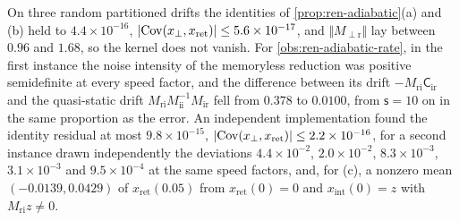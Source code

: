 \begin{numcheck}\label{chk:ren-adiabatic}
On three random partitioned drifts the identities of \cref{prop:ren-adiabatic}(a) and (b) held to $4.4\times10^{-16}$, $\lvert\operatorname{Cov}(x_\perp,x_{\mathrm{ret}})\rvert\le5.6\times10^{-17}$, and $\Vert M_{\perp\mathrm r}\Vert$ lay between $0.96$ and $1.68$, so the kernel does not vanish. For \cref{obs:ren-adiabatic-rate}, in the first instance the noise intensity of the memoryless reduction was positive semidefinite at every speed factor, and the difference between its drift $-M_{\mathrm{ri}}\mathsf C_{\mathrm{ir}}$ and the quasi-static drift $M_{\mathrm{ri}}M_{\mathrm{ii}}^{-1}M_{\mathrm{ir}}$ fell from $0.378$ to $0.0100$, from $\mathsf s=10$ on in the same proportion as the error. An independent implementation found the identity residual at most $9.8\times10^{-15}$, $\lvert\operatorname{Cov}(x_\perp,x_{\mathrm{ret}})\rvert\le2.2\times10^{-16}$, for a second instance drawn independently the deviations $4.4\times10^{-2}$, $2.0\times10^{-2}$, $8.3\times10^{-3}$, $3.1\times10^{-3}$ and $9.5\times10^{-4}$ at the same speed factors, and, for (c), a nonzero mean $(-0.0139,0.0429)$ of $x_{\mathrm{ret}}(0.05)$ from $x_{\mathrm{ret}}(0)=0$ and $x_{\mathrm{int}}(0)=z$ with $M_{\mathrm{ri}}z\neq0$.
\end{numcheck}

